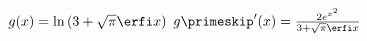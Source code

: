 {$g(x) =\ln \left(3+\sqrt{\pi} \erfi x\right)$
}
{$g\primeskip'(x) = \frac{2e^{x^2}}{3+\sqrt{\pi} \erfi x}$
}
